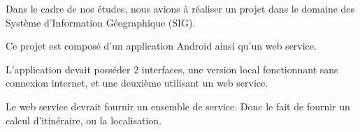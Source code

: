 Dans le cadre de nos études, nous avions à réaliser un projet dans le domaine des Système d'Information Géographique (SIG).

Ce projet est composé d'un application Android ainsi qu'un web service.

L'application devait posséder 2 interfaces, une version local fonctionnant sans connexion internet, et une deuxième utilisant un web service.

Le web service devrait fournir un ensemble de service. Donc le fait de fournir un calcul d'itinéraire, ou la localisation.